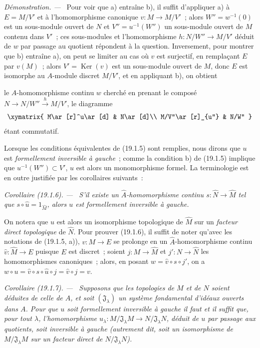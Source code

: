 \documentclass[10pt,oneside]{book}
\makeatletter
\newcommand{\setmanualcurrentlabel}[1]{\def\@currentlabel{#1}}
\newcommand{\oldpage}[2][]{%
  \setcounter{footnote}{0}%
  \marginpar{\scriptsize\textbf{#1}~|~#2}\ignorespaces}
\newenvironment{corollary}[1][]{%
  \setmanualcurrentlabel{#1}\par\medskip\noindent\itshape Corollaire (#1). ---\ }{\par}
\newenvironment{proof}{%
  \par\medskip\noindent\textit{Démonstration. ---\ }}{\par}
\makeatother
\begin{document}
\begin{proof}
Pour voir que a) entraîne b), il suffit d'appliquer a) à $E=M/V'$ et à
l'homomorphisme canonique $v:M\to M/V'$~; alors $W''=w^{-1}(0)$ est un
sous-module ouvert de $N$ et $V''=u^{-1}(W'')$ un sous-module ouvert de $M$
contenu dans $V'$~; ces sous-modules et l'homomorphisme
$h:N/W''\to M/V'$ déduit de $w$ par passage au quotient répondent à la
question. Inversement, pour montrer que b) entraîne a), on peut se limiter au
cas où $v$ est surjectif, en remplaçant $E$ par $v(M)$~; alors
$V'=\operatorname{Ker}(v)$ est un sous-module ouvert de $M$, donc $E$ est
isomorphe au $A$-module discret $M/V'$, et en appliquant b), on obtient

\oldpage[0\textsubscript{IV-1}]{73}

le $A$-homomorphisme continu $w$ cherché en prenant le composé
$N\to N/W''\xrightarrow{h}M/V'$, le diagramme
\[
  \xymatrix{
    M\ar[r]^u\ar[d] & N\ar[d]\\
    M/V''\ar[r]_{u''} & N/W''
  }
\]
étant commutatif.
\end{proof}

Lorsque les conditions équivalentes de (19.1.5) sont remplies, nous dirons que
$u$ est \emph{formellement inversible à gauche}~; comme la condition b) de
(19.1.5) implique que $u^{-1}(W'')\subset V'$, $u$ est alors un monomorphisme
formel. La terminologie est en outre justifiée par les corollaires suivants~:

\begin{corollary}[19.1.6]
\label{0.19.1.6-fr}
S'il existe un $\widehat A$-homomorphisme continu
$s:\widehat N\to\widehat M$ tel que
$s\circ\widehat u=1_{\widehat M}$, alors $u$ est formellement inversible à
gauche.
\end{corollary}

On notera que $\widehat u$ est alors un isomorphisme topologique de
$\widehat M$ sur un \emph{facteur direct topologique} de $\widehat N$. Pour
prouver (19.1.6), il suffit de noter qu'avec les notations de (19.1.5, a)),
$v:M\to E$ se prolonge en un $\widehat A$-homomorphisme continu
$\widehat v:\widehat M\to E$ puisque $E$ est discret~; soient
$j:M\to\widehat M$ et $j':N\to\widehat N$ les homomorphismes canoniques~;
alors, en posant $w=\widehat v\circ s\circ j'$, on a
$w\circ u=\widehat v\circ s\circ\widehat u\circ j=\widehat v\circ j=v$.

\begin{corollary}[19.1.7]
\label{0.19.1.7-fr}
Supposons que les topologies de $M$ et de $N$ soient déduites de celle de $A$,
et soit $(\mathfrak J_\lambda)$ un système fondamental d'idéaux ouverts dans
$A$. Pour que $u$ soit formellement inversible à gauche il faut et il suffit
que, pour tout $\lambda$, l'homomorphisme
$u_\lambda:M/\mathfrak J_\lambda M\to N/\mathfrak J_\lambda N$, déduit de
$u$ par passage aux quotients, soit inversible à gauche (autrement dit, soit
un isomorphisme de $M/\mathfrak J_\lambda M$ sur un facteur direct de
$N/\mathfrak J_\lambda N$).
\end{corollary}
\end{document}
